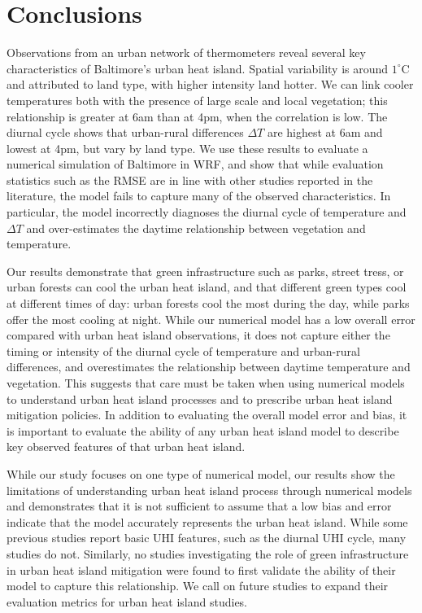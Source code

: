\documentclass[draft,linenumbers]{agujournal}
\begin{document}
\section{Conclusions}\label{sec:conclusions}
Observations from an urban network of thermometers reveal several key characteristics of Baltimore's urban heat island. Spatial variability is around $1^\circ$C and attributed to land type, with higher intensity land hotter. We can link cooler temperatures both with the presence of large scale and local vegetation; this relationship is greater at 6am than at 4pm, when the correlation is low. The diurnal cycle shows that urban-rural differences $\Delta T$ are highest at 6am and lowest at 4pm, but vary by land type. We use these results to evaluate a numerical simulation of Baltimore in WRF, and show that while evaluation statistics such as the RMSE are in line with other studies reported in the literature, the model fails to capture many of the observed characteristics. In particular, the model incorrectly diagnoses the diurnal cycle of temperature and $\Delta T$ and over-estimates the daytime relationship between vegetation and temperature. 

Our results demonstrate that green infrastructure such as parks, street tress, or urban forests can cool the urban heat island, and that different green types cool at different times of day: urban forests cool the most during the day, while parks offer the most cooling at night. While our numerical model has a low overall error compared with urban heat island observations, it does not capture either the timing or intensity of the diurnal cycle of temperature and urban-rural differences, and overestimates the relationship between daytime temperature and vegetation. This suggests that care must be taken when using numerical models to understand urban heat island processes and to prescribe urban heat island mitigation policies. In addition to evaluating the overall model error and bias, it is important to evaluate the ability of any urban heat island model to describe key observed features of that urban heat island. 

While our study focuses on one type of numerical model, our results show the limitations of understanding urban heat island process through numerical models and demonstrates that it is not sufficient to assume that a low bias and error indicate that the model accurately represents the urban heat island.  While some previous studies report basic UHI features, such as the diurnal UHI cycle, many studies do not. Similarly, no studies investigating the role of green infrastructure in urban heat island mitigation were found to first validate the ability of their model to capture this relationship. We call on future studies to expand their evaluation metrics for urban heat island studies. 
\end{document}
